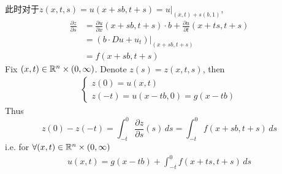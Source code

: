 	\begin{solution}
		此时对于$z(x , t , s) = u(x + sb , t + s) = u \Big|_{(x , t) + s(b , 1)}$, 
		\begin{align}
			\frac{\partial z}{\partial s} 
			&= \frac{\partial u}{\partial x}(x + sb , t + s) \cdot b + \frac{\partial u}{\partial t}(x + ts , t + s) \\
			&= \left( b \cdot Du + u_t \right)\Big|_{(x + sb , t + s)} \\
			&= f(x + sb , t + s)
		\end{align}
		Fix $(x , t) \in \mathbb{R}^n \times (0 , \infty)$. Denote $z(s) = z(x , t , s)$, then
		\begin{align}
			\begin{cases}
				z(0) = u(x , t) \\
				z(-t) = u(x - tb , 0) = g(x - tb)
			\end{cases}
		\end{align}
		Thus
		\[
			z(0) - z(-t) 
			= \int_{-t}^{0} \frac{\partial z}{\partial s}(s) \, ds 
			= \int_{-t}^{0} f(x + sb , t + s) \, ds
		\]
		i.e. for $\forall (x , t) \in \mathbb{R}^n \times (0 , \infty)$
		\begin{align}
			u(x , t) = g(x - tb) + \int_{-t}^{0} f(x + ts , t + s) \, ds 
		\end{align}
	\end{solution}


	\ifx\allfiles\undefined

\fi
